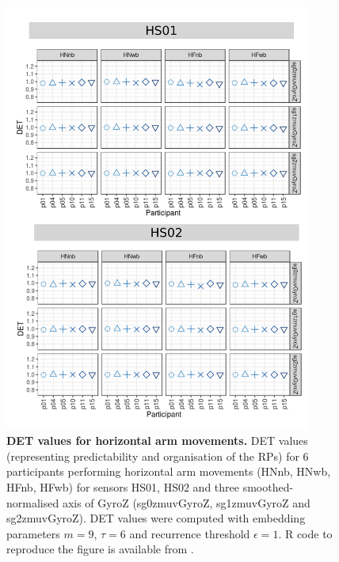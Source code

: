 \begin{figure}[!h]
\centering
\includegraphics[width=0.9\textwidth]{rqa_det_H_w500}
    \caption{
	{\bf DET values for horizontal arm movements.}	
    	DET values (representing predictability and organisation of the RPs)
	for 6 participants performing horizontal arm movements 
	(HNnb, HNwb, HFnb, HFwb)
	for sensors HS01, HS02 and three smoothed-normalised axis 
	of GyroZ (sg0zmuvGyroZ, sg1zmuvGyroZ and sg2zmuvGyroZ).
	DET values were computed with 
	embedding parameters $m=9$, $\tau=6$ and recurrence threshold
	$\epsilon=1$.
	R code to reproduce the figure is available from \cite{hwum2018}.
        }
    \label{fig:rqa_det_H}
\end{figure}
